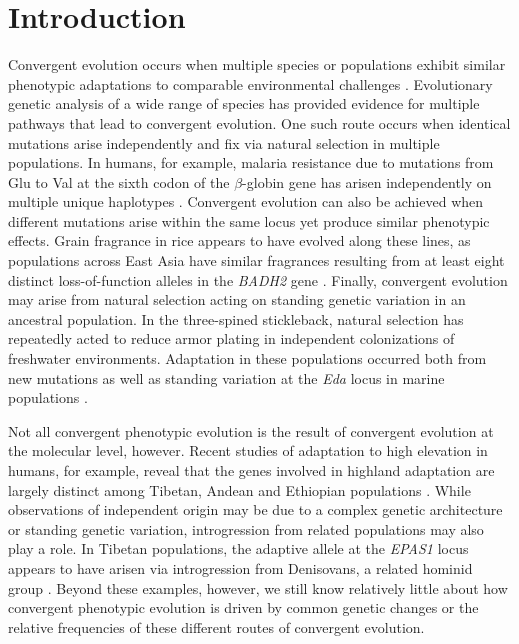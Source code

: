 \section*{Introduction}
\noindent Convergent evolution occurs when multiple species or populations exhibit similar phenotypic adaptations to comparable environmental challenges \cite[]{Wood_2005_15881688,Arendt_2008_18022278,Elmer_2011_21459472}.
Evolutionary genetic analysis of a wide range of species has 
provided evidence for multiple pathways that lead to convergent evolution. 
One such route occurs when identical mutations arise independently and fix via natural selection in multiple populations. 
In humans, for example, malaria resistance due to mutations from Glu to Val at the sixth codon of the $\beta$-globin gene has arisen independently on multiple unique haplotypes  \cite[]{Currat_2002_11741197,Kwiatkowski_2005_16001361}.  
Convergent evolution can also be achieved when different mutations arise within the same locus yet produce similar phenotypic effects.  
Grain fragrance in rice appears to have evolved along these lines, as populations across East Asia have similar fragrances resulting from at least eight distinct loss-of-function alleles in the  \emph{BADH2} gene \cite[]{Kovach_2009_19706531}.  
Finally, convergent evolution may arise from natural selection acting on standing genetic variation in an ancestral population.  
In the three-spined stickleback, natural selection has repeatedly acted to reduce armor plating in independent colonizations of freshwater environments.  
Adaptation in these populations occurred both from new mutations as well as standing variation at the \emph{Eda} locus in marine populations \cite[]{Colosimo_2005_15790847}.  

Not all convergent phenotypic evolution is the result of convergent evolution at the molecular level, however.  
Recent studies of adaptation to high elevation in humans, for example, reveal that the genes involved in highland adaptation are largely distinct among Tibetan, Andean and Ethiopian populations \cite[]{Bigham_2010_20838600,Scheinfeldt_2012_22264333,Alkorta-Aranburu_2012_23236293}. 
While observations of independent origin may be due to a complex genetic architecture or standing genetic variation, introgression from related populations may also play a role.  
In Tibetan populations, the adaptive allele at the \emph{EPAS1} locus appears to have arisen via introgression from Denisovans, a related hominid group \cite[]{huerta2014altitude}.
Beyond these examples, however, we still know relatively little about how convergent phenotypic evolution is driven by common genetic changes or the relative frequencies of these different routes of convergent evolution.


